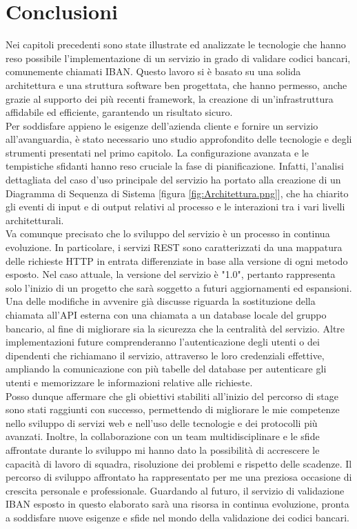 \chapter{Conclusioni}
\label{chap:Conclusioni}


Nei capitoli precedenti sono state illustrate ed analizzate le tecnologie che hanno reso possibile l'implementazione di un servizio in grado di validare codici bancari, comunemente chiamati IBAN. Questo lavoro si è basato su una solida architettura e una struttura software ben progettata, che hanno permesso, anche grazie al supporto dei più recenti framework, la creazione di un'infrastruttura affidabile ed efficiente, garantendo un risultato sicuro.\\
Per soddisfare appieno le esigenze dell'azienda cliente e fornire un servizio all'avanguardia, è stato necessario uno studio approfondito delle tecnologie e degli strumenti presentati nel primo capitolo. La configurazione avanzata e le tempistiche sfidanti hanno reso cruciale la fase di pianificazione. Infatti, l'analisi dettagliata del caso d'uso principale del servizio ha portato alla creazione di un Diagramma di Sequenza di Sistema [figura \ref{fig:Architettura.png}], che ha chiarito gli eventi di input e di output relativi al processo e le interazioni tra i vari livelli architetturali.\\
Va comunque precisato che lo sviluppo del servizio è un processo in continua evoluzione. In particolare, i servizi REST sono caratterizzati da una mappatura delle richieste HTTP in entrata differenziate in base alla versione di ogni metodo esposto. Nel caso attuale, la versione del servizio è "1.0", pertanto rappresenta solo l'inizio di un progetto che sarà soggetto a futuri aggiornamenti ed espansioni. Una delle modifiche in avvenire già discusse riguarda la sostituzione della chiamata all'API esterna con una chiamata a un database locale del gruppo bancario, al fine di migliorare sia la sicurezza che la centralità del servizio. Altre implementazioni future comprenderanno l'autenticazione degli utenti o dei dipendenti che richiamano il servizio, attraverso le loro credenziali effettive, ampliando la comunicazione con più tabelle del database per autenticare gli utenti e memorizzare le informazioni relative alle richieste.\\
Posso dunque affermare che gli obiettivi stabiliti all'inizio del percorso di stage sono stati raggiunti con successo, permettendo di migliorare le mie competenze nello sviluppo di servizi web e nell'uso delle tecnologie e dei protocolli più avanzati. Inoltre, la collaborazione con un team multidisciplinare e le sfide affrontate durante lo sviluppo mi hanno dato la possibilità di accrescere le capacità di lavoro di squadra, risoluzione dei problemi e rispetto delle scadenze. Il percorso di sviluppo affrontato ha rappresentato per me una preziosa occasione di crescita personale e professionale. Guardando al futuro, il servizio di validazione IBAN esposto in questo elaborato sarà una risorsa in continua evoluzione, pronta a soddisfare nuove esigenze e sfide nel mondo della validazione dei codici bancari.
